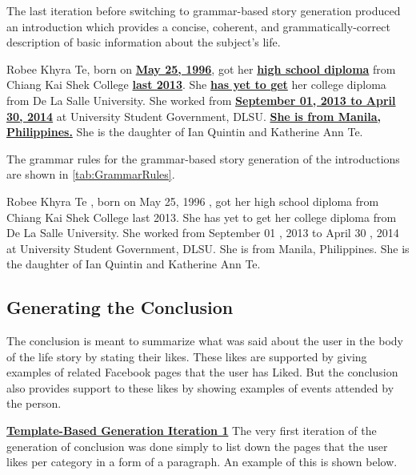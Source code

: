 The last iteration before switching to grammar-based story generation produced an introduction which provides a concise, coherent, and grammatically-correct description of basic information about the subject's life.

\begin{center} Robee Khyra Te, born on \underline{\textbf{May 25, 1996}}, got her \underline{\textbf{high school diploma}} from Chiang Kai Shek College \underline{\textbf{last 2013}}. She \underline{\textbf{has yet to get}} her college diploma from De La Salle University. She worked from \underline{\textbf{September 01, 2013 to April 30, 2014}} at University Student Government, DLSU. \underline{\textbf{She is from Manila, Philippines.}} She is the daughter of Ian Quintin and Katherine Ann Te. \end{center}

The grammar rules for the grammar-based story generation of the introductions are shown in \ref{tab:GrammarRules}.

\begin{center} Robee Khyra Te , born on May 25, 1996 , got her high school diploma from Chiang Kai Shek College last 2013. She has yet to get her college diploma from De La Salle University. She worked from September 01 , 2013 to April 30 , 2014 at University Student Government, DLSU. She is from Manila, Philippines. She is the daughter of Ian Quintin and Katherine Ann Te.
\end{center}

\subsection{Generating the Conclusion}
The conclusion is meant to summarize what was said about the user in the body of the life story by stating their likes. These likes are supported by giving examples of related Facebook pages that the user has Liked. But the conclusion also provides support to these likes by showing examples of events attended by the person.

\underline{\textbf{Template-Based Generation Iteration 1}} \newline
The very first iteration of the generation of conclusion was done simply to list down the pages that the user likes per category in a form of a paragraph. An example of this is shown below.

